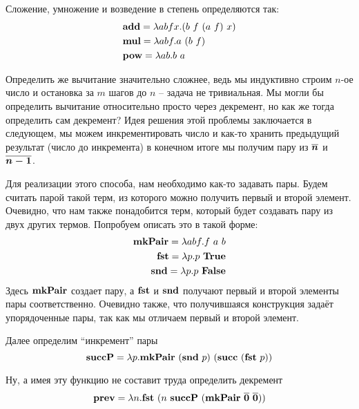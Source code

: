 \documentclass[lambda.tex]{subfiles}
\begin{document}
Сложение, умножение и возведение в степень определяются так:
\begin{align*}
	&\text{\textbf{add}} = \lambda abfx.(b\ f\ (a\ f)\ x)\\
	&\text{\textbf{mul}} = \lambda abf.a\ (b\ f)\\
	&\text{\textbf{pow}} = \lambda ab.b\ a
\end{align*}

Определить же вычитание значительно сложнее, ведь мы индуктивно строим $n$-ое число и остановка за $m$ шагов до $n$ -- задача не тривиальная. Мы могли бы определить вычитание относительно просто через декремент, но как же тогда определить сам декремент?
Идея решения этой проблемы заключается в следующем, мы можем инкрементировать число и как-то хранить предыдущий результат (число до инкремента) в конечном итоге мы получим пару из $\boldsymbol{\overline{n}}$ и $\boldsymbol{\overline{n-1}}$.

Для реализации этого способа, нам необходимо как-то задавать пары. Будем считать парой такой терм, из которого можно получить первый и второй элемент. Очевидно, что нам также понадобится терм, который будет создавать пару из двух других термов. Попробуем описать это в такой форме:
\begin{align*}
	\text{\textbf{mkPair}} = \lambda abf.f\ a\ b\\
	\text{\textbf{fst}} = \lambda p.p\ \text{\textbf{True}}\\
	\text{\textbf{snd}} = \lambda p.p\ \text{\textbf{False}}
\end{align*}
Здесь $\text{\textbf{mkPair}}$ создает пару, а $\text{\textbf{fst}}$ и $\text{\textbf{snd}}$ получают первый и второй элементы пары соответственно. Очевидно также, что получившаяся конструкция задаёт упорядоченные пары, так как мы отличаем первый и второй элемент.

Далее определим ``инкремент'' пары
\[\mmterm{succP} = \lambda p. \mmterm{mkPair}\ (\mmterm{snd}\ p)\ (\mmterm{succ}\ (\mmterm{fst}\ p))\]

Ну, а имея эту функцию не составит труда определить декремент
\[\mmterm{prev} = \lambda n.\mmterm{fst}\ (n\ \mmterm{succP}\ (\mmterm{mkPair}\ \mmchurchn{0}\ \mmchurchn{0}))\]
\end{document}
